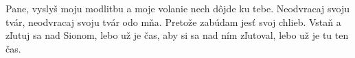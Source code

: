 Pane, vyslyš moju modlitbu
a moje volanie nech dôjde ku tebe.
\versseparator
Neodvracaj svoju tvár, neodvracaj svoju tvár odo mňa.
\versseparator
Pretože zabúdam jesť svoj chlieb.
\versseparator
Vstaň a zľutuj sa nad Sionom,
lebo už je čas, aby si sa nad ním zľutoval,
lebo už je tu ten čas.